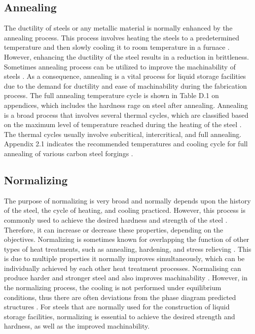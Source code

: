 \subsection{Annealing}
The ductility of steels or any metallic material is normally enhanced by the annealing process. This process involves heating the steels to a predetermined temperature and then slowly cooling it to room temperature in a furnace \cite{singh2020applied}. However, enhancing the ductility of the steel results in a reduction in brittleness. Sometimes annealing process can be utilized to improve the machinability of steels \cite{nikkhah2019improved}. As a consequence, annealing is a vital process for liquid storage facilities due to the demand for ductility and ease of machinability during the fabrication process. The full annealing temperature cycle is shown in Table D.1 on appendices, which includes the hardness rage on steel after annealing. 
Annealing is a broad process that involves several thermal cycles, which are classified based on the maximum level of temperature reached during the heating of the steel \cite{singh2020applied}. The thermal cycles usually involve subcritical, intercritical, and full annealing. Appendix 2.1 indicates the recommended temperatures and cooling cycle for full annealing of various carbon steel forgings \cite{singh2020applied}. 

\subsection{Normalizing}
The purpose of normalizing is very broad and normally depends upon the history of the steel, the cycle of heating, and cooling practiced. However, this process is commonly used to achieve the desired hardness and strength of the steel \cite{singh2020applied}. Therefore, it can increase or decrease these properties, depending on the objectives. 
Normalizing is sometimes known for overlapping the function of other types of heat treatments, such as annealing, hardening, and stress relieving \cite{singh2020applied}. This is due to multiple properties it normally improves simultaneously, which can be individually achieved by each other heat treatment processes. Normalising can produce harder and stronger steel and also improves machinability \cite{mampuya2021effect}. However, in the normalizing process, the cooling is not performed under equilibrium conditions, thus there are often deviations from the phase diagram predicted structures \cite{singh2020applied}.  For steels that are normally used for the construction of liquid storage facilities, normalizing is essential to achieve the desired strength and hardness, as well as the improved machinability.

